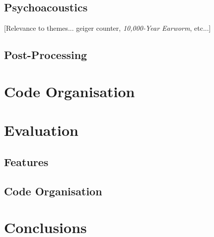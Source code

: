\documentclass[a4paper, 11pt]{article}
\begin{document}
\begin{flushleft}
\subsection{Psychoacoustics}

[Relevance to themes... geiger counter, \textit{10,000-Year Earworm}, etc...]

\subsection{Post-Processing}

\section{Code Organisation}

\section{Evaluation}\label{Evaluation}

\subsection{Features}

\subsection{Code Organisation}

\section{Conclusions}



\end{flushleft}
\end{document}
